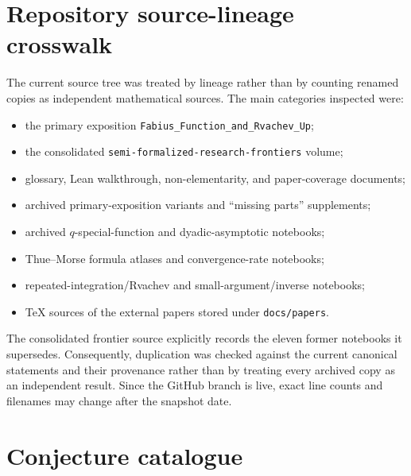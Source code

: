 \documentclass[11pt]{article}
\theoremstyle{definition}
\theoremstyle{remark}
\begin{document}
\section{Repository source-lineage crosswalk}

The current source tree was treated by lineage rather than by counting renamed copies as independent mathematical sources.  The main categories inspected were:
\begin{itemize}
  \item the primary exposition \texttt{Fabius\_Function\_and\_Rvachev\_Up};
  \item the consolidated \texttt{semi-formalized-research-frontiers} volume;
  \item glossary, Lean walkthrough, non-elementarity, and paper-coverage documents;
  \item archived primary-exposition variants and ``missing parts'' supplements;
  \item archived $q$-special-function and dyadic-asymptotic notebooks;
  \item Thue--Morse formula atlases and convergence-rate notebooks;
  \item repeated-integration/Rvachev and small-argument/inverse notebooks;
  \item TeX sources of the external papers stored under \texttt{docs/papers}.
\end{itemize}
The consolidated frontier source explicitly records the eleven former notebooks it supersedes.  Consequently, duplication was checked against the current canonical statements and their provenance rather than by treating every archived copy as an independent result.  Since the GitHub branch is live, exact line counts and filenames may change after the snapshot date.

\section{Conjecture catalogue}
\end{document}
